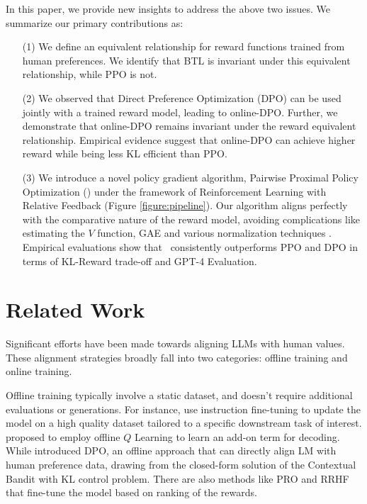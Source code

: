 \documentclass{article} %
\newcommand{\algn}{\text{P3O}}
\begin{document}
In this paper, we provide new insights to address the above two issues. We summarize our primary contributions as:
\begin{itemize}
    \item[(1)] We define an equivalent relationship for reward functions trained from human preferences. We identify that BTL is invariant under this equivalent relationship, while PPO is not.
    \item[(2)] We observed that Direct Preference Optimization (DPO) 
    \citep{rafailov2023direct} can be used jointly with a trained reward model, leading to online-DPO. Further, we demonstrate that online-DPO remains invariant under the reward equivalent relationship. Empirical evidence suggest that online-DPO can achieve higher reward while being less KL efficient than PPO.
    \item[(3)] We introduce a novel policy gradient algorithm, Pairwise Proximal Policy Optimization (\algn) under the framework of Reinforcement Learning with Relative Feedback (Figure \ref{figure:pipeline}). Our algorithm aligns perfectly with the comparative nature of the reward model, avoiding complications like estimating the $V$ function, GAE and various normalization techniques \citep{zheng2023secrets}. Empirical evaluations show that \algn\ consistently outperforms PPO and DPO in terms of KL-Reward trade-off and GPT-4 Evaluation.
\end{itemize}
\section{Related Work}
Significant efforts have been made towards aligning LLMs with human values. These alignment strategies broadly fall into two categories: offline training and online training. 

Offline training typically involve a static dataset, and doesn't require additional evaluations or generations. For instance, \citet{thoppilan2022lamda,gunasekar2023textbooks} use instruction fine-tuning to update the model on a high quality dataset tailored to a specific downstream task of interest. \citet{snell2022offline} proposed to employ offline $Q$ Learning to learn an add-on term for decoding. While \citet{rafailov2023direct} introduced DPO, an offline approach that can directly align LM with human preference data, drawing from the closed-form solution of the Contextual Bandit with KL control problem. There are also methods like PRO \citep{song2023preference} and RRHF \citep{yuan2023rrhf} that fine-tune the model based on ranking of the rewards.
\end{document}
